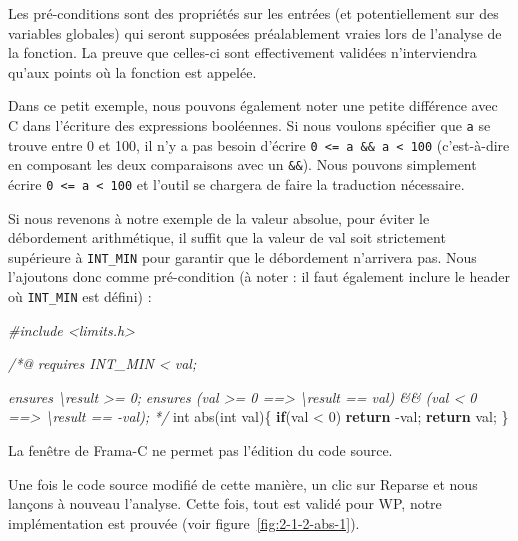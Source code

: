 \documentclass[12pt,francais,]{scrbook}
\newenvironment{Shaded}{}{}
\newcommand{\KeywordTok}[1]{\textcolor[rgb]{0.00,0.44,0.13}{\textbf{{#1}}}}
\newcommand{\DataTypeTok}[1]{\textcolor[rgb]{0.56,0.13,0.00}{{#1}}}
\newcommand{\DecValTok}[1]{\textcolor[rgb]{0.25,0.63,0.44}{{#1}}}
\newcommand{\CommentTok}[1]{\textcolor[rgb]{0.38,0.63,0.69}{\textit{{#1}}}}
\newcommand{\NormalTok}[1]{{#1}}
\newenvironment{zdsalertblock}[1]{%
  \tcolorbox[beamer,%
    noparskip,breakable,
    colback=LightCoral,colframe=DarkRed,%
    colbacklower=Tomato,%
    title=#1]
}{\endtcolorbox}
\begin{document}
Les pré-conditions sont des propriétés sur les entrées (et
potentiellement sur des variables globales) qui seront supposées
préalablement vraies lors de l'analyse de la fonction. La preuve que
celles-ci sont effectivement validées n'interviendra qu'aux points où la
fonction est appelée.

Dans ce petit exemple, nous pouvons également noter une petite
différence avec C dans l'écriture des expressions booléennes. Si nous
voulons spécifier que \texttt{a} se trouve entre 0 et 100, il n'y a pas
besoin d'écrire \texttt{0\ \textless{}=\ a\ \&\&\ a\ \textless{}\ 100}
(c'est-à-dire en composant les deux comparaisons avec un \texttt{\&\&}).
Nous pouvons simplement écrire
\texttt{0\ \textless{}=\ a\ \textless{}\ 100} et l'outil se chargera de
faire la traduction nécessaire.

Si nous revenons à notre exemple de la valeur absolue, pour éviter le
débordement arithmétique, il suffit que la valeur de val soit
strictement supérieure à \texttt{INT\_MIN} pour garantir que le
débordement n'arrivera pas. Nous l'ajoutons donc comme pré-condition (à
noter : il faut également inclure le header où \texttt{INT\_MIN} est
défini) :

\begin{footnotesize}\begin{Shaded}
\begin{Highlighting}[]
\CommentTok{#include <limits.h>}

\CommentTok{/*@}
\CommentTok{  requires INT_MIN < val;}

\CommentTok{  ensures \textbackslash{}result >= 0;}
\CommentTok{  ensures (val >= 0 ==> \textbackslash{}result == val) && }
\CommentTok{          (val < 0 ==> \textbackslash{}result == -val);}
\CommentTok{*/}
\DataTypeTok{int} \NormalTok{abs(}\DataTypeTok{int} \NormalTok{val)\{}
  \KeywordTok{if}\NormalTok{(val < }\DecValTok{0}\NormalTok{) }\KeywordTok{return} \NormalTok{-val;}
  \KeywordTok{return} \NormalTok{val;}
\NormalTok{\}}
\end{Highlighting}
\end{Shaded}\end{footnotesize}

\begin{zdsalertblock}{Attention}
  La fenêtre de Frama-C ne permet pas
  l'édition du code source.
\end{zdsalertblock}

Une fois le code source modifié de cette manière, un clic sur
\og{}Reparse\fg{} et nous lançons à nouveau l'analyse. Cette fois, tout est
validé pour WP, notre implémentation est prouvée (voir
figure~\ref{fig:2-1-2-abs-1}).
\end{document}
